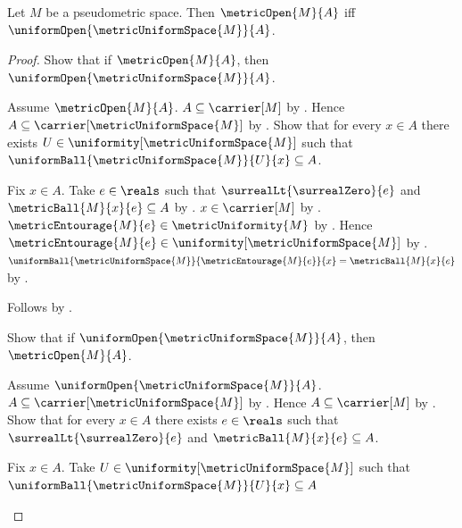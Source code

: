 \begin{theorem}\label{metric_open_iff_induced_uniform_open}
    Let $M$ be a pseudometric space.
    Then
        $\metricOpen{M}{A}$ iff
        $\uniformOpen{\metricUniformSpace{M}}{A}$.
\end{theorem}
\begin{proof}
    Show that if $\metricOpen{M}{A}$, then
        $\uniformOpen{\metricUniformSpace{M}}{A}$.
    \begin{subproof}
        Assume $\metricOpen{M}{A}$.
        $A\subseteq\carrier[M]$ by .
        Hence $A\subseteq\carrier[\metricUniformSpace{M}]$
            by .
        Show that for every $x\in A$ there exists
            $U\in\uniformity[\metricUniformSpace{M}]$ such that
            $\uniformBall{\metricUniformSpace{M}}{U}{x}\subseteq A$.
        \begin{subproof}
            Fix $x\in A$.
            Take $e\in\reals$ such that
                $\surrealLt{\surrealZero}{e}$ and
                $\metricBall{M}{x}{e}\subseteq A$
                by .
            $x\in\carrier[M]$ by .
            $\metricEntourage{M}{e}\in\metricUniformity{M}$
                by .
            Hence
                $\metricEntourage{M}{e}
                    \in\uniformity[\metricUniformSpace{M}]$
                by .
            $\uniformBall{\metricUniformSpace{M}}
                {\metricEntourage{M}{e}}{x}
                =\metricBall{M}{x}{e}$
                by .
        \end{subproof}
        Follows by .
    \end{subproof}
    Show that if $\uniformOpen{\metricUniformSpace{M}}{A}$, then
        $\metricOpen{M}{A}$.
    \begin{subproof}
        Assume $\uniformOpen{\metricUniformSpace{M}}{A}$.
        $A\subseteq\carrier[\metricUniformSpace{M}]$
            by .
        Hence $A\subseteq\carrier[M]$
            by .
        Show that for every $x\in A$ there exists $e\in\reals$ such that
            $\surrealLt{\surrealZero}{e}$ and
            $\metricBall{M}{x}{e}\subseteq A$.
        \begin{subproof}
            Fix $x\in A$.
            Take $U\in\uniformity[\metricUniformSpace{M}]$ such that
                $\uniformBall{\metricUniformSpace{M}}{U}{x}\subseteq A$

\end{subproof}
\end{subproof}
\end{proof}
